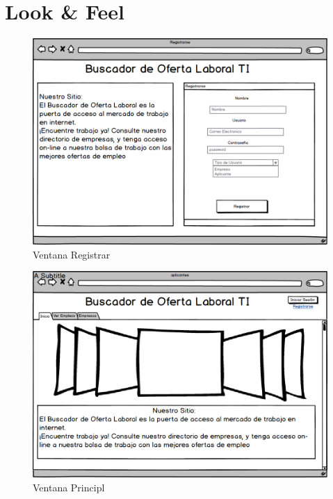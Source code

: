 \section{Look \& Feel}

\begin{figure}[h]
\begin{center}
	\includegraphics[scale=0.55]{./resources/01registrar.png}
	\caption{Ventana Registrar}
	\label{fig:Registrar}
\end{center}
\end{figure}


\newpage 
\begin{figure}[h]
\begin{center}
	\includegraphics[scale=0.55]{./resources/02principal.png}
	\caption{Ventana Principl}
	\label{fig:Principal}
\end{center}
\end{figure}

